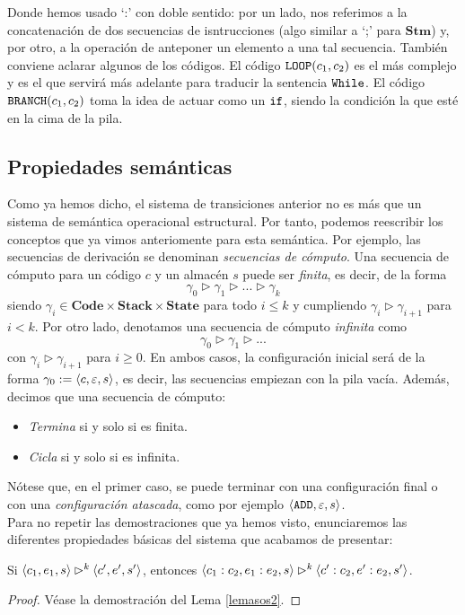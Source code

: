 Donde hemos usado `:' con doble sentido: por un lado, nos referimos a la concatenación de dos secuencias de isntrucciones (algo similar a `;' para $\mathbf{Stm}$) y, por otro, a la operación de anteponer un elemento a una tal secuencia. También conviene aclarar algunos de los códigos. El código $\texttt{LOOP}(c_1,c_2)$ es el más complejo y es el que servirá más adelante para traducir la sentencia $\texttt{While}$. El código $\texttt{BRANCH}(c_1, c_2)$ toma la idea de actuar como un $\texttt{if}$, siendo la condición la que esté en la cima de la pila.
\\ 

\subsection{Propiedades semánticas}

Como ya hemos dicho, el sistema de transiciones anterior no es más que un sistema de semántica operacional estructural. Por tanto, podemos reescribir los conceptos que ya vimos anteriomente para esta semántica. Por ejemplo, las secuencias de derivación se denominan \textit{secuencias de cómputo}. Una secuencia de cómputo para un código $c$ y un almacén $s$ puede ser \textit{finita}, es decir, de la forma
\[
    \gamma_0 \rhd \gamma_1 \rhd ... \rhd \gamma_k
\]
siendo $\gamma_i \in \textbf{Code}\times\textbf{Stack} \times \textbf{State}$ para todo $i\leq k$ y cumpliendo $\gamma_i \rhd \gamma_{i+1}$ para $i<k$. Por otro lado, denotamos una secuencia de cómputo \textit{infinita} como
\[
    \gamma_0 \rhd \gamma_1 \rhd ...
\]
con  $\gamma_i \rhd \gamma_{i+1}$ para $i\geq 0$. En ambos casos, la configuración inicial será de la forma $\gamma_0 := \langle c, \varepsilon, s \rangle$, es decir, las secuencias empiezan con la pila vacía. Además, decimos que una secuencia de cómputo:
\begin{itemize}
    \item \textit{Termina} si y solo si es finita.
    \item \textit{Cicla} si y solo si es infinita.
\end{itemize}
Nótese que, en el primer caso, se puede terminar con una configuración final o con una \textit{configuración atascada}, como por ejemplo $\langle \texttt{ADD}, \varepsilon, s\rangle$.
\\

Para no repetir las demostraciones que ya hemos visto, enunciaremos las diferentes propiedades básicas del sistema que acabamos de presentar:

\begin{lema}\label{lemaam1}
Si $\langle c_1, e_1, s \rangle\rhd^k \langle c', e', s' \rangle$, entonces $\langle c_1:c_2, e_1:e_2, s \rangle\rhd^k \langle c':c_2, e':e_2, s' \rangle$.
\end{lema}
\begin{proof}
Véase la demostración del Lema \ref{lemasos2}.
\end{proof}


